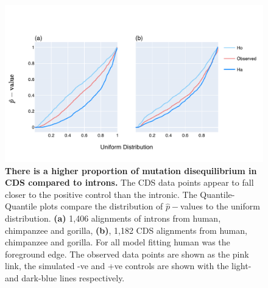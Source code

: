 \begin{figure}[h]
\centering
\includegraphics[width=	\textwidth]{figures/plots/primate/LRT-QQ.pdf}
\caption{\textbf{There is a higher proportion of mutation disequilibrium in CDS compared to introns.} The CDS data points appear to fall closer to the positive control than the intronic. The Quantile-Quantile plots compare the distribution of $\hat p-$values to the uniform distribution. \textbf{(a)} 1,406 alignments of introns from human, chimpanzee and gorilla, \textbf{(b)}, 1,182 CDS alignments from human, chimpanzee and gorilla. For all model fitting human was the foreground edge. The observed data points are shown as the pink link, the simulated -ve and +ve controls are shown with the light- and dark-blue lines respectively. }
\label{fig:primate_lrt_qq}
\end{figure}
